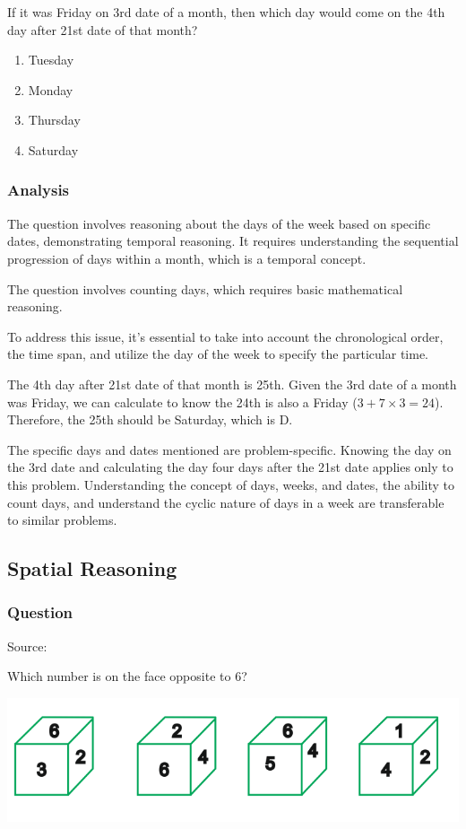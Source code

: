 \documentclass[12pt, a4paper]{article}
\begin{document}
If it was Friday on 3rd date of a month, then which day would come on the 4th day after 21st date of that month?

\begin{enumerate}[label=(\Alph*)]
    \item Tuesday
    \item Monday
    \item Thursday
    \item Saturday
\end{enumerate}

\subsubsection*{Analysis}
The question involves reasoning about the days of the week based on specific dates, demonstrating temporal reasoning. It requires understanding the sequential progression of days within a month, which is a temporal concept.

The question involves counting days, which requires basic mathematical reasoning.

To address this issue, it's essential to take into account the chronological order, the time span, and utilize the day of the week to specify the particular time.

The 4th day after 21st date of that month is 25th. Given the 3rd date of a month was Friday, we can calculate to know the 24th is also a Friday ($3 + 7 \times 3 = 24$). Therefore, the 25th should be Saturday, which is D.

The specific days and dates mentioned are problem-specific. Knowing the day on the 3rd date and calculating the day four days after the 21st date applies only to this problem. Understanding the concept of days, weeks, and dates, the ability to count days, and understand the cyclic nature of days in a week are transferable to similar problems.

\subsection*{Spatial Reasoning}
\subsubsection*{Question}
Source: \cite{Gajanand_2022a}

Which number is on the face opposite to 6?

\includegraphics[width=1\textwidth]{Figure.4.5.png}
\end{document}
